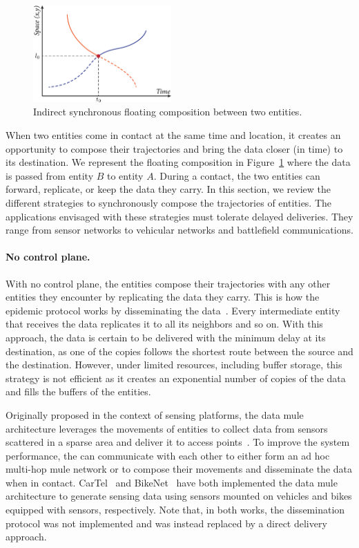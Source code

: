 \begin{figure}
    \vspace{-10pt}
    \centering
    \includegraphics[width=5.3cm]{figures/dtn-indirect-sync-nongeo.pdf}
    \caption{Indirect synchronous floating composition between two entities.}
    \label{fig:dtn-indirect-sync-nongeo}
\end{figure}
When two entities come in contact at the same time and location, it creates an opportunity to compose their trajectories and bring the data closer (in time) to its destination. We represent the floating composition in Figure~\ref{fig:dtn-indirect-sync-nongeo} where the data is passed from entity $B$ to entity $A$. During a contact, the two entities can forward, replicate, or keep the data they carry. In this section, we review the different strategies to synchronously compose the trajectories of entities. The applications envisaged with these strategies must tolerate delayed deliveries. They range from sensor networks to vehicular networks and battlefield communications.

\paragraph{No control plane.}
With no control plane, the entities compose their trajectories with any other entities they encounter by replicating the data they carry. This is how the epidemic protocol works by disseminating the data~\cite{vahdat2000epidemic}. Every intermediate entity that receives the data replicates it to all its neighbors and so on. With this approach, the data is certain to be delivered with the minimum delay at its destination, as one of the copies follows the shortest route between the source and the destination. However, under limited resources, including buffer storage, this strategy is not efficient as it creates an exponential number of copies of the data and fills the buffers of the entities.

Originally proposed in the context of sensing platforms, the data \acrshort{mule} architecture leverages the movements of entities to collect data from sensors scattered in a sparse area and deliver it to access points~\cite{shah2003data}. To improve the system performance, the  can communicate with each other to either form an ad hoc multi-hop \acrshort{mule} network or to compose their movements and disseminate the data when in contact. CarTel~\cite{hull2006cartel} and BikeNet~\cite{eisenman2009bikenet} have both implemented the data \acrshort{mule} architecture to generate sensing data using sensors mounted on vehicles and bikes equipped with sensors, respectively. Note that, in both works, the dissemination protocol was not implemented and was instead replaced by a direct delivery approach.

